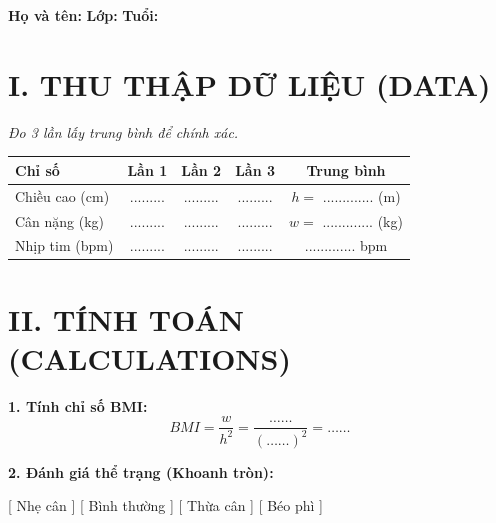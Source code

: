 \documentclass[12pt,a4paper]{article}
\begin{document}
\begin{center}
    \vspace{0.5cm}
\end{center}

\noindent \textbf{Họ và tên:} \dotfill \textbf{Lớp:} \dotfill \textbf{Tuổi:} \dotfill

\section*{\color{medblue} I. THU THẬP DỮ LIỆU (DATA)}
\textit{Đo 3 lần lấy trung bình để chính xác.}

\begin{center}
\renewcommand{\arraystretch}{1.5}
\begin{tabular}{|l|c|c|c|c|}
\hline
\textbf{Chỉ số} & \textbf{Lần 1} & \textbf{Lần 2} & \textbf{Lần 3} & \textbf{Trung bình} \\
\hline
Chiều cao (cm) & ......... & ......... & ......... & $h = $ ............. (m) \\
\hline
Cân nặng (kg) & ......... & ......... & ......... & $w = $ ............. (kg) \\
\hline
Nhịp tim (bpm) & ......... & ......... & ......... & ............. bpm \\
\hline
\end{tabular}
\end{center}

\section*{\color{medblue} II. TÍNH TOÁN (CALCULATIONS)}

\textbf{1. Tính chỉ số BMI:}
$$ BMI = \frac{w}{h^2} = \frac{\dots\dots}{(\dots\dots)^2} = \dots\dots $$

\textbf{2. Đánh giá thể trạng (Khoanh tròn):}
\begin{center}
    [ Nhẹ cân ] \hspace{1cm} [ Bình thường ] \hspace{1cm} [ Thừa cân ] \hspace{1cm} [ Béo phì ]
\end{center}
\end{document}
